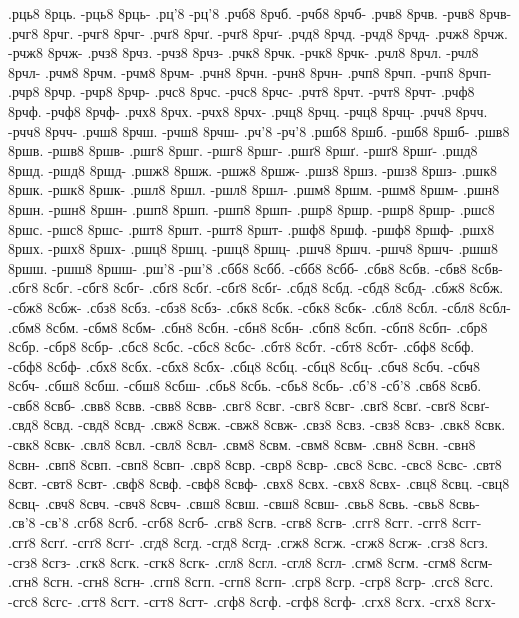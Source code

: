{.рць8 8рць. -рць8 8рць-
.рц'8 -рц'8
.рчб8 8рчб. -рчб8 8рчб-
.рчв8 8рчв. -рчв8 8рчв-
.рчг8 8рчг. -рчг8 8рчг-
.рчґ8 8рчґ. -рчґ8 8рчґ-
.рчд8 8рчд. -рчд8 8рчд-
.рчж8 8рчж. -рчж8 8рчж-
.рчз8 8рчз. -рчз8 8рчз-
.рчк8 8рчк. -рчк8 8рчк-
.рчл8 8рчл. -рчл8 8рчл-
.рчм8 8рчм. -рчм8 8рчм-
.рчн8 8рчн. -рчн8 8рчн-
.рчп8 8рчп. -рчп8 8рчп-
.рчр8 8рчр. -рчр8 8рчр-
.рчс8 8рчс. -рчс8 8рчс-
.рчт8 8рчт. -рчт8 8рчт-
.рчф8 8рчф. -рчф8 8рчф-
.рчх8 8рчх. -рчх8 8рчх-
.рчц8 8рчц. -рчц8 8рчц-
.рчч8 8рчч. -рчч8 8рчч-
.рчш8 8рчш. -рчш8 8рчш-
.рч'8 -рч'8
.ршб8 8ршб. -ршб8 8ршб-
.ршв8 8ршв. -ршв8 8ршв-
.ршг8 8ршг. -ршг8 8ршг-
.ршґ8 8ршґ. -ршґ8 8ршґ-
.ршд8 8ршд. -ршд8 8ршд-
.ршж8 8ршж. -ршж8 8ршж-
.ршз8 8ршз. -ршз8 8ршз-
.ршк8 8ршк. -ршк8 8ршк-
.ршл8 8ршл. -ршл8 8ршл-
.ршм8 8ршм. -ршм8 8ршм-
.ршн8 8ршн. -ршн8 8ршн-
.ршп8 8ршп. -ршп8 8ршп-
.ршр8 8ршр. -ршр8 8ршр-
.ршс8 8ршс. -ршс8 8ршс-
.ршт8 8ршт. -ршт8 8ршт-
.ршф8 8ршф. -ршф8 8ршф-
.ршх8 8ршх. -ршх8 8ршх-
.ршц8 8ршц. -ршц8 8ршц-
.ршч8 8ршч. -ршч8 8ршч-
.ршш8 8ршш. -ршш8 8ршш-
.рш'8 -рш'8
.сбб8 8сбб. -сбб8 8сбб-
.сбв8 8сбв. -сбв8 8сбв-
.сбг8 8сбг. -сбг8 8сбг-
.сбґ8 8сбґ. -сбґ8 8сбґ-
.сбд8 8сбд. -сбд8 8сбд-
.сбж8 8сбж. -сбж8 8сбж-
.сбз8 8сбз. -сбз8 8сбз-
.сбк8 8сбк. -сбк8 8сбк-
.сбл8 8сбл. -сбл8 8сбл-
.сбм8 8сбм. -сбм8 8сбм-
.сбн8 8сбн. -сбн8 8сбн-
.сбп8 8сбп. -сбп8 8сбп-
.сбр8 8сбр. -сбр8 8сбр-
.сбс8 8сбс. -сбс8 8сбс-
.сбт8 8сбт. -сбт8 8сбт-
.сбф8 8сбф. -сбф8 8сбф-
.сбх8 8сбх. -сбх8 8сбх-
.сбц8 8сбц. -сбц8 8сбц-
.сбч8 8сбч. -сбч8 8сбч-
.сбш8 8сбш. -сбш8 8сбш-
.сбь8 8сбь. -сбь8 8сбь-
.сб'8 -сб'8
.свб8 8свб. -свб8 8свб-
.свв8 8свв. -свв8 8свв-
.свг8 8свг. -свг8 8свг-
.свґ8 8свґ. -свґ8 8свґ-
.свд8 8свд. -свд8 8свд-
.свж8 8свж. -свж8 8свж-
.свз8 8свз. -свз8 8свз-
.свк8 8свк. -свк8 8свк-
.свл8 8свл. -свл8 8свл-
.свм8 8свм. -свм8 8свм-
.свн8 8свн. -свн8 8свн-
.свп8 8свп. -свп8 8свп-
.свр8 8свр. -свр8 8свр-
.свс8 8свс. -свс8 8свс-
.свт8 8свт. -свт8 8свт-
.свф8 8свф. -свф8 8свф-
.свх8 8свх. -свх8 8свх-
.свц8 8свц. -свц8 8свц-
.свч8 8свч. -свч8 8свч-
.свш8 8свш. -свш8 8свш-
.свь8 8свь. -свь8 8свь-
.св'8 -св'8
.сгб8 8сгб. -сгб8 8сгб-
.сгв8 8сгв. -сгв8 8сгв-
.сгг8 8сгг. -сгг8 8сгг-
.сгґ8 8сгґ. -сгґ8 8сгґ-
.сгд8 8сгд. -сгд8 8сгд-
.сгж8 8сгж. -сгж8 8сгж-
.сгз8 8сгз. -сгз8 8сгз-
.сгк8 8сгк. -сгк8 8сгк-
.сгл8 8сгл. -сгл8 8сгл-
.сгм8 8сгм. -сгм8 8сгм-
.сгн8 8сгн. -сгн8 8сгн-
.сгп8 8сгп. -сгп8 8сгп-
.сгр8 8сгр. -сгр8 8сгр-
.сгс8 8сгс. -сгс8 8сгс-
.сгт8 8сгт. -сгт8 8сгт-
.сгф8 8сгф. -сгф8 8сгф-
.сгх8 8сгх. -сгх8 8сгх-
}
